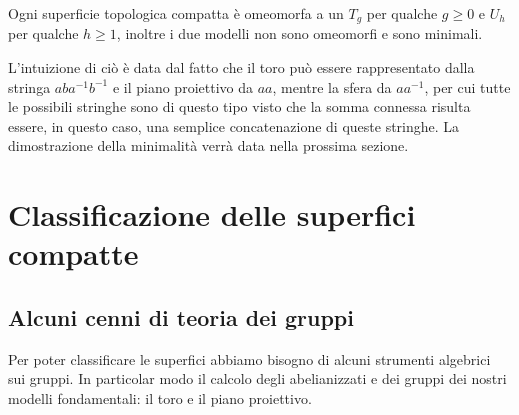 \begin{theorem}
	Ogni superficie topologica compatta è omeomorfa a un $T_g$ per qualche $g \ge 0$ e $U_h$ per qualche $h \ge 1$, inoltre i due modelli non sono omeomorfi e sono minimali. 
\end{theorem}

L'intuizione di ciò è data dal fatto che il toro può essere rappresentato dalla stringa $aba^{-1}b^{-1}$ e il piano proiettivo da $aa$, mentre la sfera da $aa^{-1}$, per cui tutte le possibili stringhe sono di questo tipo visto che la somma connessa risulta essere, in questo caso, una semplice concatenazione di queste stringhe. La dimostrazione della minimalità verrà data nella prossima sezione.


\newpage
\section{Classificazione delle superfici compatte}
\subsection{\textcolor{TopAlg}{\textbf{Alcuni cenni di teoria dei gruppi}}}

Per poter classificare le superfici abbiamo bisogno di alcuni strumenti algebrici sui gruppi. In particolar modo il calcolo degli abelianizzati e dei gruppi dei nostri modelli fondamentali: il toro e il piano proiettivo.

